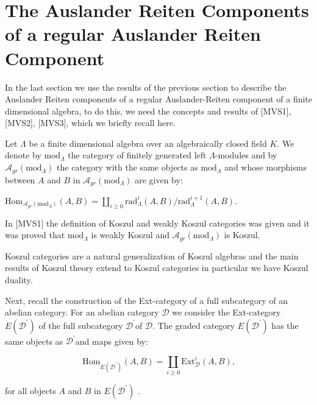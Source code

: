 \documentclass{amsart}
\theoremstyle{plain}
\numberwithin{equation}{section}
\begin{document}
\section{The Auslander Reiten Components of a regular \newline
Auslander Reiten Component}

In the last section we use the results of the previous section to describe
the Auslander Reiten components of a regular Auslander-Reiten component of a
finite dimensional algebra, to do this, we need the concepts and results of
[MVS1], [MVS2], [MVS3], which we briefly recall here.

Let $\Lambda $ be a finite dimensional algebra over an algebraically closed
field $K$. We denote by $\mathrm{mod}_{\Lambda }$ the category of finitely
generated left $\Lambda $-modules and by $\mathcal{A}_{gr}(\mathrm{mod}_{\Lambda })$ the category with the same objects as $\mathrm{mod}_{\Lambda }$
and whose morphisms between $A$ and $B$ in $\mathcal{A}_{gr}(\mathrm{mod}_{\Lambda })$ are given by:

\begin{center}
$\mathrm{Hom}_{\mathcal{A}_{gr}(\mathrm{mod}_{\Lambda })}(A,B)=
\coprod_{i\geq 0}\mathrm{rad}_{\Lambda }^{i}(A,B)/\mathrm{rad}_{\Lambda
}^{i+1}(A,B)$.
\end{center}

In [MVS1] the definition of Koszul and weakly Koszul categories was given
and it was proved that $\mathrm{mod}_{\Lambda }$ is weakly Koszul and $\mathcal{A}_{gr}(\mathrm{mod}_{\Lambda })$ is Koszul.

Koszul categories are a natural generalization of Koszul algebras and the
main results of Koszul theory extend to Koszul categories in particular we
have Koszul duality.

Next, recall the construction of the Ext-category of a full subcategory of
an abelian category. For an abelian category $\mathcal{D}$ we consider the
Ext-category $E(\mathcal{D}^{\prime })$ of the full subcategory $\mathcal{D}^{\prime }$of $\mathcal{D}$. The graded category $E(\mathcal{D}^{\prime })$
has the same objects as $\mathcal{D}^{\prime }$and maps given by:

\begin{equation*}
\mathrm{Hom}_{E(\mathcal{D}^{\prime })}(A,B)=\coprod_{i\geq 0}\mathrm{Ext}_{\mathcal{D}}^{i}(A,B)\text{,}
\end{equation*}

for all objects $A$ and $B$ in $E(\mathcal{D}^{\prime })$ .
\end{document}
